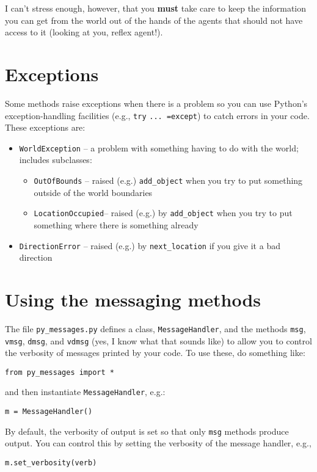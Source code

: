\documentclass[11pt]{tufte-handout}
\begin{document}
I can't stress enough, however, that you \textbf{must} take care to keep the information you can get from the world out of the hands of the agents that should not have access to it (looking at you, reflex agent!).

\section{Exceptions}
\label{sec:org05a5653}

Some methods raise exceptions when there is a problem so you can use Python's exception-handling facilities (e.g., \texttt{try} \texttt{... =except}) to catch errors in your code.  These exceptions are:
\begin{itemize}
\item \texttt{WorldException} -- a problem with something having to do with the world; includes subclasses:
\begin{itemize}
\item \texttt{OutOfBounds} -- raised (e.g.) \texttt{add\_object} when you try to put something outside of the world boundaries
\item \texttt{LocationOccupied}-- raised (e.g.) by \texttt{add\_object} when you try to put something where there is something already
\end{itemize}
\item \texttt{DirectionError} -- raised (e.g.) by \texttt{next\_location} if you give it a bad direction
\end{itemize}

\section{Using the messaging methods}
\label{sec:org31b0f58}

The file \texttt{py\_messages.py} defines a class, \texttt{MessageHandler}, and the methods \texttt{msg}, \texttt{vmsg}, \texttt{dmsg}, and \texttt{vdmsg} (yes, I know what that sounds like) to allow you to control the verbosity of messages printed by your code.  To use these, do something like:
\begin{verbatim}
from py_messages import *
\end{verbatim}

and then  instantiate \texttt{MessageHandler}, e.g.:
\begin{verbatim}
m = MessageHandler()
\end{verbatim}


By default, the verbosity of output is set so that only \texttt{msg} methods produce output.  You can control this by setting the verbosity of the message handler, e.g.,
\begin{verbatim}
m.set_verbosity(verb)
\end{verbatim}
\end{document}

